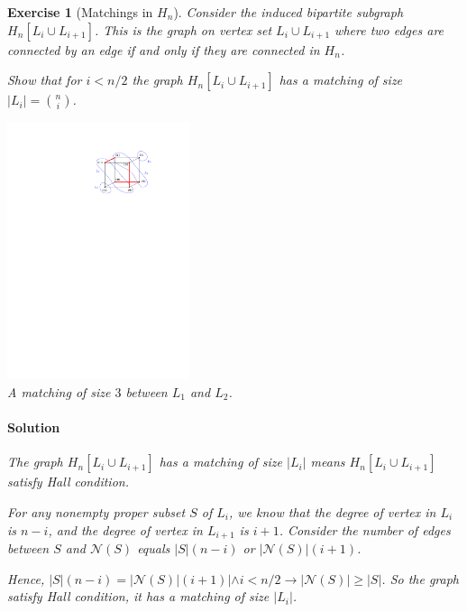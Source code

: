 \documentclass[12pt,a4]{article}
\newtheorem{exercise}[theorem]{Exercise}
\begin{document}
\begin{exercise}[Matchings in $H_n$]
  Consider the induced bipartite subgraph $H_n[ L_i \cup L_{i+1}]$. This is 
  the graph on vertex set $L_i \cup L_{i+1}$ where two edges are connected
  by an edge if and only if they are connected in $H_n$.
  \medskip

  Show that for $i < n/2$ the graph $H_n[ L_i \cup L_{i+1}]$
  has a matching of size $|L_i| = {n \choose i}$.

\begin{center}
  \includegraphics[width=0.4\textwidth]{hamming-3-dim-matching.pdf}\\
  {\small A matching of size $3$ between $L_1$ and $L_2$.}
\end{center}
\label{exercise-matchings-in-H}
\paragraph{Solution}
The graph $H_n[L_i \cup L_{i+1}]$ has a matching of size $|L_i|$ means $H_n[L_i \cup L_{i+1}]$ satisfy Hall condition. 

For any nonempty proper subset $S$ of $L_i$, we know that the degree of vertex in $L_i$ is $n-i$, and the degree of vertex in $L_{i+1}$ is $i+1$. Consider the number of edges between $S$ and $\mathcal{N}(S)$ equals $|S|(n-i)$ or $|\mathcal{N}(S)|(i+1)$.

Hence, $|S|(n-i)=|\mathcal{N}(S)|(i+1)| \land i < n/2 \rightarrow |\mathcal{N}(S)|\geq |S|$. So the graph satisfy Hall condition, 
it has a matching of size $|L_i|$.
\end{exercise}
\end{document}
